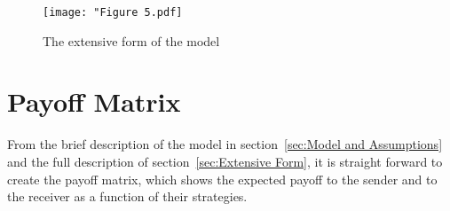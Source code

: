 \documentclass[a4paper,12pt]{article}
\numberwithin{equation}{section}
\begin{document}
\begin{figure}[!h]
\begin{center}
\leavevmode
\texttt{[image: "Figure 5.pdf]}
\caption{The extensive form of the model}
\label{fig:Figure 3.pdf}
\end{center}
\end{figure}

\newpage


\section{Payoff Matrix}
\label{sec:Payoff Matrix}

From the brief description of the model in section~\ref{sec:Model and Assumptions} and the full description of section~\ref{sec:Extensive Form}, it is straight forward to create the payoff matrix, which shows the expected payoff to the sender and to the receiver as a function of their strategies.

\vspace{6mm}
\end{document}
